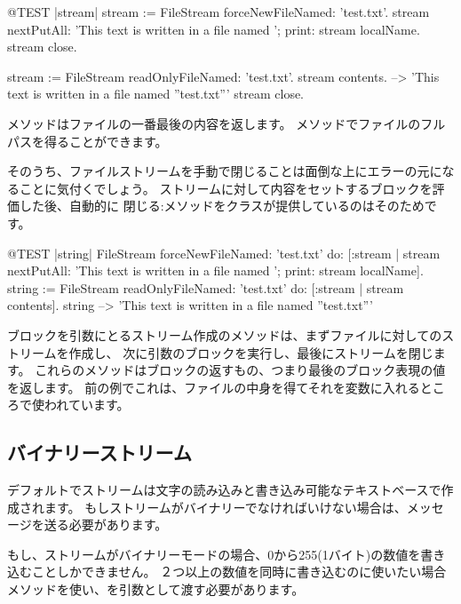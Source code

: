 \documentclass[a4paper,10pt,twoside]{book}
\begin{document}
\begin{code}{@TEST |stream|}
stream := FileStream forceNewFileNamed: 'test.txt'.
stream
    nextPutAll: 'This text is written in a file named ';
    print: stream localName.
stream close.

stream := FileStream readOnlyFileNamed: 'test.txt'.
stream contents. --> 'This text is written in a file named ''test.txt'''
stream close.
\end{code}


メソッドはファイルの一番最後の内容を返します。
メソッドでファイルのフルパスを得ることができます。


そのうち、ファイルストリームを手動で閉じることは面倒な上にエラーの元になることに気付くでしょう。
ストリームに対して内容をセットするブロックを評価した後、自動的に
閉じる:メソッドをクラスが提供しているのはそのためです。


\begin{code}{@TEST |string|}
FileStream
    forceNewFileNamed: 'test.txt'
    do: [:stream |
        stream
            nextPutAll: 'This text is written in a file named ';
            print: stream localName].
string := FileStream
            readOnlyFileNamed: 'test.txt'
            do: [:stream | stream contents].
string --> 'This text is written in a file named ''test.txt'''
\end{code}

ブロックを引数にとるストリーム作成のメソッドは、まずファイルに対してのストリームを作成し、
次に引数のブロックを実行し、最後にストリームを閉じます。
これらのメソッドはブロックの返すもの、つまり最後のブロック表現の値を返します。
前の例でこれは、ファイルの中身を得てそれを変数に入れるところで使われています。

\subsection{バイナリーストリーム}


デフォルトでストリームは文字の読み込みと書き込み可能なテキストベースで作成されます。
もしストリームがバイナリーでなければいけない場合は、メッセージを送る必要があります。


もし、ストリームがバイナリーモードの場合、0から255(1バイト)の数値を書き込むことしかできません。
２つ以上の数値を同時に書き込むのに使いたい場合メソッドを使い、を引数として渡す必要があります。
\end{document}
